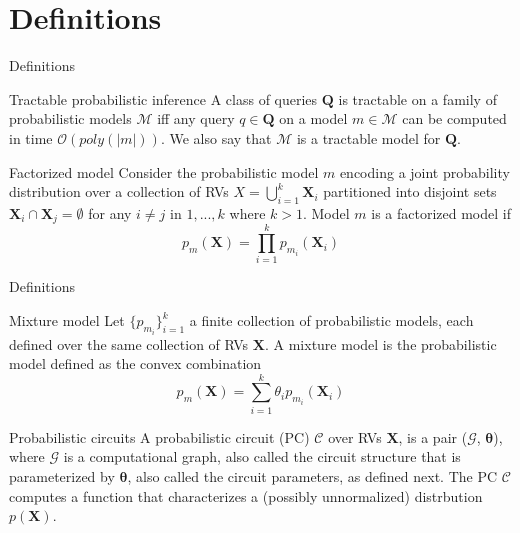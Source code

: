\documentclass{beamer}
\begin{document}
\section{Definitions}
\begin{frame}{Definitions}
    \begin{block}{Tractable probabilistic inference}
        A class of queries $\mathbf{Q}$ is tractable
        on a family of probabilistic models $\mathcal{M}$ iff any query $q \in \mathbf{Q}$ on a model $m \in \mathcal{M}$ can be
        computed in time $\mathcal{O}(poly(|m|))$. We also say that $\mathcal{M}$ is a tractable model for $\mathbf{Q}$.
    \end{block}

    \begin{block}{Factorized model}
        Consider the probabilistic model $m$ encoding a joint
        probability distribution over a collection of RVs $X = \bigcup_{i = 1}^{k} \mathbf{X}_i$ partitioned into disjoint sets
        $\mathbf{X}_i \cap \mathbf{X}_j = \emptyset$ for any $i \neq j$ in $1, . . . , k$ where $k > 1$. Model $m$ is a factorized model if
        $$
        p_m(\mathbf{X}) = \prod_{i = 1}^k p_{m_i}(\mathbf{X}_i)
        $$
    \end{block}
\end{frame}
\begin{frame}{Definitions}

    \begin{block}{Mixture model}
        Let $\{p_{m_i}\}_{i = 1}^k$ a finite collection of probabilistic models,
        each defined over the same collection of RVs $\mathbf{X}$. A mixture model is the probabilistic model
        defined as the convex combination
        $$
        p_m(\mathbf{X}) = \sum_{i = 1}^k \theta_i p_{m_i}(\mathbf{X}_i)
        $$
    \end{block}

    \begin{block}{Probabilistic circuits}
        A probabilistic circuit (PC) $\mathcal{C}$ over RVs $\mathbf{X}$,
        is a pair ($\mathcal{G}$, $\mathbf{\theta}$), where $\mathcal{G}$ is a computational graph, also called the circuit structure that
        is parameterized by $\mathbf{\theta}$, also called the circuit parameters, as defined next. The PC $\mathcal{C}$
        computes a function that characterizes a (possibly unnormalized) distrbution $p(\mathbf{X})$.
    \end{block}
    
\end{frame}
\end{document}
